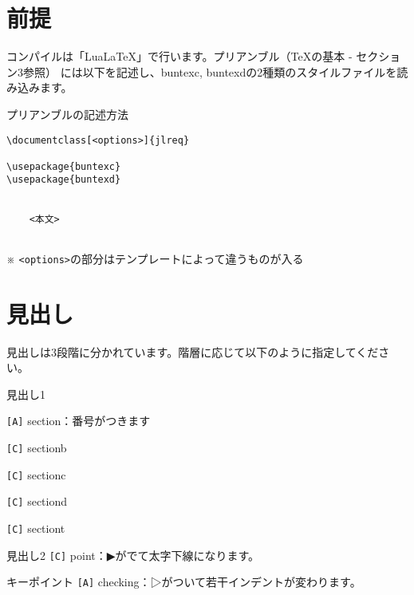 \begin{multicols*}{2}
\section{前提}
コンパイルは「Lua\LaTeX 」で行います。プリアンブル（\TeX の基本 - セクション3参照）
には以下を記述し、buntexc, buntexdの2種類のスタイルファイルを読み込みます。
\begin{framebox-simple}{プリアンブルの記述方法}
\begin{verbatim}
\documentclass[<options>]{jlreq}

\usepackage{buntexc}
\usepackage{buntexd}


    <本文>


\end{verbatim}
※ \verb|<options>|の部分はテンプレートによって違うものが入る
\end{framebox-simple}

\section{見出し}
見出しは3段階に分かれています。階層に応じて以下のように指定してください。
\begin{framebox-simple}{見出し1}
    \begin{reitemize}
        \item \verb|[A]| section：番号がつきます
        \item \verb|[C]| sectionb
        \item \verb|[C]| sectionc
        \item \verb|[C]| sectiond
        \item \verb|[C]| sectiont
    \end{reitemize}
\end{framebox-simple}
\begin{framebox-simple}{見出し2}
    \verb|[C]| point：▶︎がでて太字下線になります。
\end{framebox-simple}
\begin{framebox-simple}{キーポイント}
    \verb|[A]| checking：▷がついて若干インデントが変わります。
\end{framebox-simple}


\end{multicols*}
